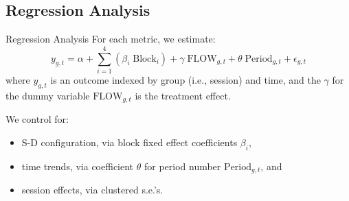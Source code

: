 \documentclass[10pt]{beamer}
\begin{document}
\subsection{Regression Analysis}



\begin{frame}{Regression Analysis}
For each metric, we estimate: 
\begin{equation} \label{eq:reg}
    y_{g,t} = \alpha + \sum^{4}_{i = 1} \left(\beta_i \; \text{Block}_i\right) + \gamma \; \text{FLOW}_{g,t} + \theta \; \text{Period}_{g,t} + \epsilon_{g,t}
\end{equation}
where $y_{g,t}$ is an outcome  indexed by group (i.e., session) and time, and the $\gamma$ for the dummy variable $\text{FLOW}_{g,t}$ is the treatment effect. %

We control for: 
\begin{itemize}
\item S-D configuration, via  block fixed effect coefficients $\beta_i$,  
\item time trends, via coefficient $\theta$ for period number $\text{Period}_{g,t}$, and
\item session effects, via clustered s.e.'s.
\end{itemize} %
 
\end{frame}
\end{document}
